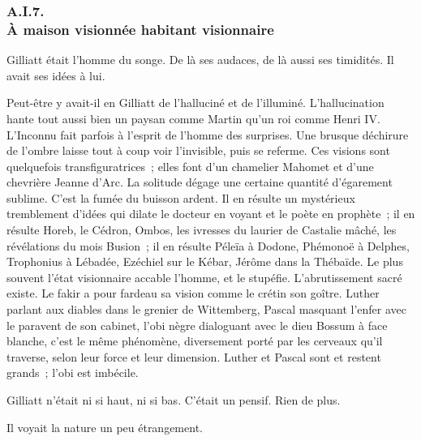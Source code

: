 \documentclass[french,twoside]{book} %
\begin{document}
 \subsubsection[{A.I.7. À maison visionnée habitant visionnaire}]{A.I.7. \\
À maison visionnée habitant visionnaire}
\noindent Gilliatt était l’homme du songe. De là ses audaces, de là aussi ses timidités. Il avait ses idées à lui.\par
Peut-être y avait-il en Gilliatt de l’halluciné et de l’illuminé. L’hallucination hante tout aussi bien un paysan comme Martin qu’un roi comme Henri IV. L’Inconnu fait parfois à l’esprit de l’homme des surprises. Une brusque déchirure de l’ombre laisse tout à coup voir l’invisible, puis se referme. Ces visions sont quelquefois transfiguratrices ; elles font d’un chamelier Mahomet et d’une chevrière Jeanne d’Arc. La solitude dégage une certaine quantité d’égarement sublime. C’est la fumée du buisson ardent. Il en résulte un mystérieux tremblement d’idées qui dilate le docteur en voyant et le poète en prophète ; il en résulte Horeb, le Cédron, Ombos, les ivresses du laurier de Castalie mâché, les révélations du mois Busion ; il en résulte Péleïa à Dodone, Phémonoë à Delphes, Trophonius à  Lébadée, Ezéchiel sur le Kébar, Jérôme dans la Thébaïde. Le plus souvent l’état visionnaire accable l’homme, et le stupéfie. L’abrutissement sacré existe. Le fakir a pour fardeau sa vision comme le crétin son goître. Luther parlant aux diables dans le grenier de Wittemberg, Pascal masquant l’enfer avec le paravent de son cabinet, l’obi nègre dialoguant avec le dieu Bossum à face blanche, c’est le même phénomène, diversement porté par les cerveaux qu’il traverse, selon leur force et leur dimension. Luther et Pascal sont et restent grands ; l’obi est imbécile.\par
Gilliatt n’était ni si haut, ni si bas. C’était un pensif. Rien de plus.\par
Il voyait la nature un peu étrangement.\par
\end{document}

